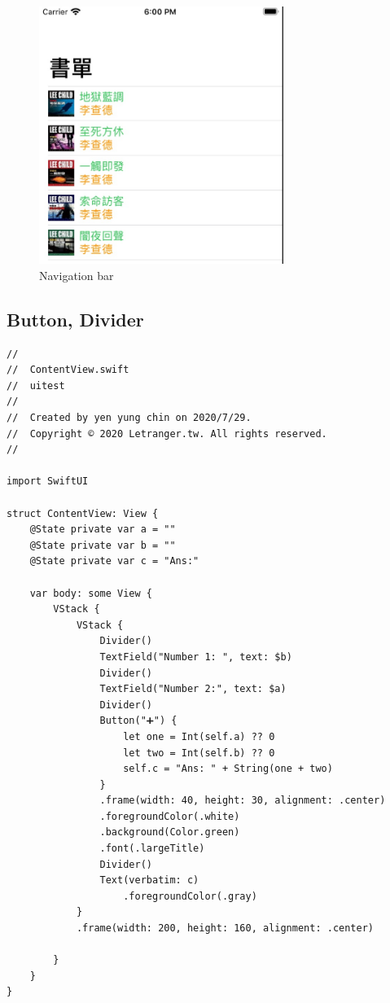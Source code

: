 \documentclass[a4paper,12pt]{article}
\begin{document}
\begin{figure}[htbp]
\centering
\includegraphics[width=300]{images/navigation-1.jpg}
\caption{\label{fig:Navigation-1}Navigation bar}
\end{figure}

\subsection{Button, Divider}
\label{sec:org300b4a8}
\lstset{breaklines=true,language=swift,label= ,caption= ,captionpos=b,firstnumber=1,numbers=left}
\begin{lstlisting}
//
//  ContentView.swift
//  uitest
//
//  Created by yen yung chin on 2020/7/29.
//  Copyright © 2020 Letranger.tw. All rights reserved.
//

import SwiftUI

struct ContentView: View {
    @State private var a = ""
    @State private var b = ""
    @State private var c = "Ans:"
    
    var body: some View {
        VStack {
            VStack {
                Divider()
                TextField("Number 1: ", text: $b)
                Divider()
                TextField("Number 2:", text: $a)
                Divider()
                Button("➕") {
                    let one = Int(self.a) ?? 0
                    let two = Int(self.b) ?? 0
                    self.c = "Ans: " + String(one + two)
                }
                .frame(width: 40, height: 30, alignment: .center)
                .foregroundColor(.white)
                .background(Color.green)
                .font(.largeTitle)
                Divider()
                Text(verbatim: c)
                    .foregroundColor(.gray)
            }
            .frame(width: 200, height: 160, alignment: .center)
            
        }
    }
}
\end{lstlisting}
\end{document}
